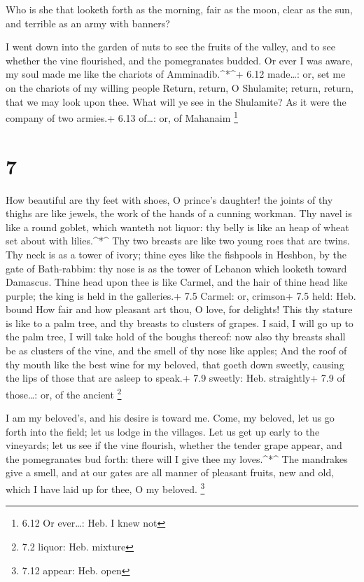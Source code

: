  Who is she that looketh forth as the morning, fair as the
moon, clear as the sun, and terrible as an army with banners?

 I went down into the garden of nuts to see the fruits of
the valley, and to see whether the vine flourished, and the pomegranates
budded.  Or ever I was aware, my soul made me like the
chariots of Amminadib.\^{}*\^{}+ 6.12 made\ldots: or, set me on the
chariots of my willing people  Return, return, O Shulamite;
return, return, that we may look upon thee. What will ye see in the
Shulamite? As it were the company of two armies.+ 6.13 of\ldots: or, of
Mahanaim \footnote{6.12 Or ever\ldots: Heb. I knew not}

\hypertarget{section-6}{%
\section{7}\label{section-6}}

 How beautiful are thy feet with shoes, O prince's daughter!
the joints of thy thighs are like jewels, the work of the hands of a
cunning workman.  Thy navel is like a round goblet, which
wanteth not liquor: thy belly is like an heap of wheat set about with
lilies.\^{}*\^{}  Thy two breasts are like two young roes
that are twins.  Thy neck is as a tower of ivory; thine eyes
like the fishpools in Heshbon, by the gate of Bath-rabbim: thy nose is
as the tower of Lebanon which looketh toward Damascus. 
Thine head upon thee is like Carmel, and the hair of thine head like
purple; the king is held in the galleries.+ 7.5 Carmel: or, crimson+ 7.5
held: Heb. bound  How fair and how pleasant art thou, O
love, for delights!  This thy stature is like to a palm
tree, and thy breasts to clusters of grapes.  I said, I will
go up to the palm tree, I will take hold of the boughs thereof: now also
thy breasts shall be as clusters of the vine, and the smell of thy nose
like apples;  And the roof of thy mouth like the best wine
for my beloved, that goeth down sweetly, causing the lips of those that
are asleep to speak.+ 7.9 sweetly: Heb. straightly+ 7.9 of those\ldots:
or, of the ancient \footnote{7.2 liquor: Heb. mixture}

 I am my beloved's, and his desire is toward me.
 Come, my beloved, let us go forth into the field; let us
lodge in the villages.  Let us get up early to the
vineyards; let us see if the vine flourish, whether the tender grape
appear, and the pomegranates bud forth: there will I give thee my
loves.\^{}*\^{}  The mandrakes give a smell, and at our
gates are all manner of pleasant fruits, new and old, which I have laid
up for thee, O my beloved. \footnote{7.12 appear: Heb. open}

